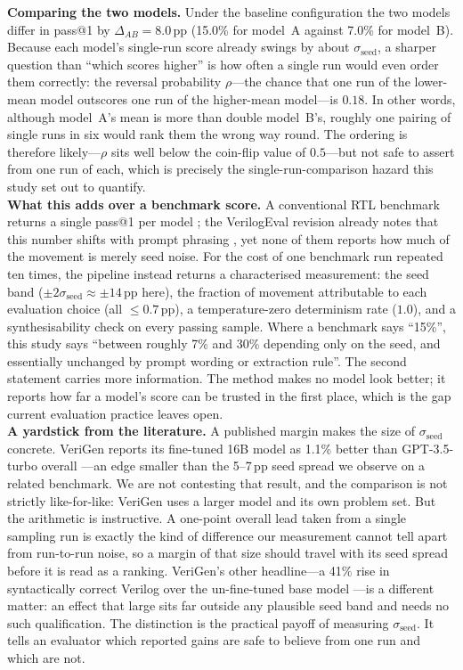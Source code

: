 \documentclass[conference]{IEEEtran}
\begin{document}
\noindent \textbf{Comparing the two models.} Under the baseline configuration the two models differ in pass@1 by $\Delta_{AB}=8.0$\,pp (15.0\% for model~A against 7.0\% for model~B). Because each model's single-run score already swings by about $\sigma_{\text{seed}}$, a sharper question than ``which scores higher'' is how often a single run would even order them correctly: the reversal probability $\rho$---the chance that one run of the lower-mean model outscores one run of the higher-mean model---is $0.18$. In other words, although model~A's mean is more than double model~B's, roughly one pairing of single runs in six would rank them the wrong way round. The ordering is therefore likely---$\rho$ sits well below the coin-flip value of $0.5$---but not safe to assert from one run of each, which is precisely the single-run-comparison hazard this study set out to quantify.\\

\noindent \textbf{What this adds over a benchmark score.} A conventional RTL benchmark returns a single pass@1 per model \cite{P12_Liu2023,P16_Lu2024}; the VerilogEval revision already notes that this number shifts with prompt phrasing \cite{P15_Pinckney2025}, yet none of them reports how much of the movement is merely seed noise. For the cost of one benchmark run repeated ten times, the pipeline instead returns a characterised measurement: the seed band ($\pm 2\sigma_{\text{seed}}\approx\pm 14$\,pp here), the fraction of movement attributable to each evaluation choice (all $\leq 0.7$\,pp), a temperature-zero determinism rate ($1.0$), and a synthesisability check on every passing sample. Where a benchmark says ``15\%'', this study says ``between roughly 7\% and 30\% depending only on the seed, and essentially unchanged by prompt wording or extraction rule''. The second statement carries more information. The method makes no model look better; it reports how far a model's score can be trusted in the first place, which is the gap current evaluation practice leaves open.\\

\noindent \textbf{A yardstick from the literature.} A published margin makes the size of $\sigma_{\text{seed}}$ concrete. VeriGen reports its fine-tuned 16B model as 1.1\% better than GPT-3.5-turbo overall \cite{P11_Thakur2024}---an edge smaller than the 5--7\,pp seed spread we observe on a related benchmark. We are not contesting that result, and the comparison is not strictly like-for-like: VeriGen uses a larger model and its own problem set. But the arithmetic is instructive. A one-point overall lead taken from a single sampling run is exactly the kind of difference our measurement cannot tell apart from run-to-run noise, so a margin of that size should travel with its seed spread before it is read as a ranking. VeriGen's other headline---a 41\% rise in syntactically correct Verilog over the un-fine-tuned base model \cite{P11_Thakur2024}---is a different matter: an effect that large sits far outside any plausible seed band and needs no such qualification. The distinction is the practical payoff of measuring $\sigma_{\text{seed}}$. It tells an evaluator which reported gains are safe to believe from one run and which are not.\\
\end{document}

